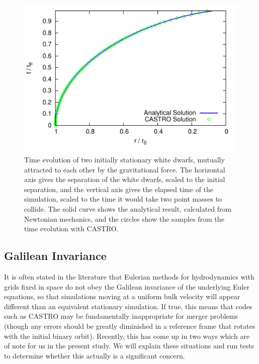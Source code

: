 \documentclass{emulateapj}
\begin{document}
\begin{figure}
  \centering
  \includegraphics[scale=1.0]{freefall/plot_freefall}
  \caption{Time evolution of two initially stationary white dwarfs,
    mutually attracted to each other by the gravitational force. The
    horizontal axis gives the separation of the white dwarfs, scaled
    to the initial separation, and the vertical axis gives the elapsed
    time of the simulation, scaled to the time it would take two point masses
    to collide. The solid curve shows the analytical result,
    calculated from Newtonian mechanics, and the circles show the
    samples from the time evolution with CASTRO.}
  \label{Fig:Free Fall}
\end{figure}

\subsection{Galilean Invariance}\label{sec:galileo}

It is often stated in the literature that Eulerian methods for
hydrodynamics with grids fixed in space do not obey the Galilean
invariance of the underlying Euler equations, so that simulations
moving at a uniform bulk velocity will appear different than an
equivalent stationary simulation. If true, this means that codes such
as CASTRO may be fundamentally inappropriate for merger problems
(though any errors should be greatly diminished in a reference frame
that rotates with the initial binary orbit). Recently, this has come
up in two ways which are of note for us in the present study. We will
explain these situations and run tests to determine whether this
actually is a significant concern.
\end{document}
